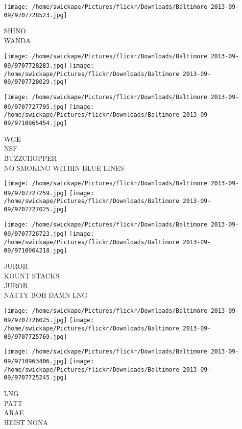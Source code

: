 \documentclass[10pt,letterpaper]{article}
\begin{document}
\vspace{0.25in}
\texttt{[image: /home/swickape/Pictures/flickr/Downloads/Baltimore 2013-09-09/9707728523.jpg]}

SHINO\\
WANDA\\
\pagebreak

\texttt{[image: /home/swickape/Pictures/flickr/Downloads/Baltimore 2013-09-09/9707728283.jpg]}
\texttt{[image: /home/swickape/Pictures/flickr/Downloads/Baltimore 2013-09-09/9707728029.jpg]}

\texttt{[image: /home/swickape/Pictures/flickr/Downloads/Baltimore 2013-09-09/9707727795.jpg]}
\texttt{[image: /home/swickape/Pictures/flickr/Downloads/Baltimore 2013-09-09/9710965454.jpg]}

WGE\\
NSF\\
BUZZCHOPPER\\
NO SMOKING WITHIN BLUE LINES\\
\pagebreak

\texttt{[image: /home/swickape/Pictures/flickr/Downloads/Baltimore 2013-09-09/9707727259.jpg]}
\texttt{[image: /home/swickape/Pictures/flickr/Downloads/Baltimore 2013-09-09/9707727025.jpg]}

\texttt{[image: /home/swickape/Pictures/flickr/Downloads/Baltimore 2013-09-09/9707726723.jpg]}
\texttt{[image: /home/swickape/Pictures/flickr/Downloads/Baltimore 2013-09-09/9710964218.jpg]}

JUROR\\
KOUNT STACKS\\
JUROR\\
NATTY BOH DAMN LNG\\
\pagebreak

\texttt{[image: /home/swickape/Pictures/flickr/Downloads/Baltimore 2013-09-09/9707726025.jpg]}
\texttt{[image: /home/swickape/Pictures/flickr/Downloads/Baltimore 2013-09-09/9707725769.jpg]}

\texttt{[image: /home/swickape/Pictures/flickr/Downloads/Baltimore 2013-09-09/9710963406.jpg]}
\texttt{[image: /home/swickape/Pictures/flickr/Downloads/Baltimore 2013-09-09/9707725245.jpg]}

LNG\\
PATT\\
ARAE\\
HEIST NONA\\
\pagebreak
\end{document}

